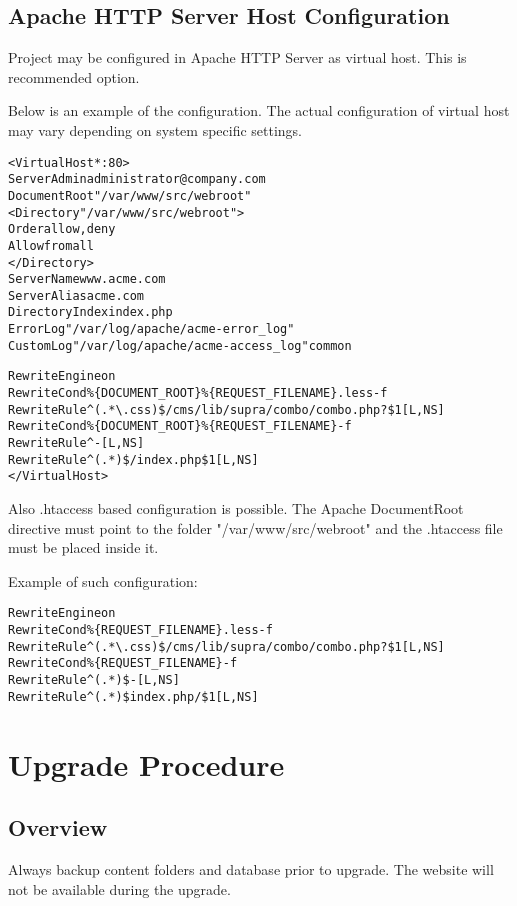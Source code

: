 \documentclass[12pt]{article}
\newcommand{\vigPathToProject}{/var/www}
\newcommand{\vigPathToSrc}{/src}
\newcommand{\vigPathToWebroot}{\vigPathToSrc/webroot}
\begin{document}
\subsection{Apache HTTP Server Host Configuration}

Project may be configured in Apache HTTP Server as virtual host. This is recommended option.

Below is an example of the configuration. The actual configuration of virtual host may vary depending on system specific settings.

\begin{alltt}
<VirtualHost *:80>
  ServerAdmin administrator@company.com
  DocumentRoot "\vigPathToProject\vigPathToWebroot"
  <Directory "\vigPathToProject\vigPathToWebroot">
    Order allow,deny
    Allow from all
  </Directory>
  ServerName www.acme.com
  ServerAlias acme.com
  DirectoryIndex index.php
  ErrorLog "/var/log/apache/acme-error\_log"
  CustomLog "/var/log/apache/acme-access\_log" common

  RewriteEngine on
  RewriteCond \%\{DOCUMENT_ROOT\}\%\{REQUEST_FILENAME\}.less -f
  RewriteRule ^(.*\textbackslash.css)\$ /cms/lib/supra/combo/combo.php?\$1 [L,NS]  
  RewriteCond \%\{DOCUMENT_ROOT\}\%\{REQUEST_FILENAME\} -f
  RewriteRule ^ - [L,NS]
  RewriteRule ^(.*)\$ /index.php\$1 [L,NS]
</VirtualHost>
\end{alltt}

Also .htaccess based configuration is possible. The Apache DocumentRoot directive must point to the folder "\vigPathToProject\vigPathToWebroot" and the .htaccess file must be placed inside it.

Example of such configuration:

\begin{alltt}
RewriteEngine on
RewriteCond \%\{REQUEST_FILENAME\}.less -f
RewriteRule ^(.*\textbackslash.css)\$ /cms/lib/supra/combo/combo.php?\$1 [L,NS]
RewriteCond \%\{REQUEST_FILENAME\} -f
RewriteRule ^(.*)\$ - [L,NS]
RewriteRule ^(.*)\$ index.php/\$1 [L,NS]
\end{alltt}

\section{Upgrade Procedure}

\subsection{Overview}
Always backup content folders and database prior to upgrade. The website will not be available during the upgrade.
\end{document}
